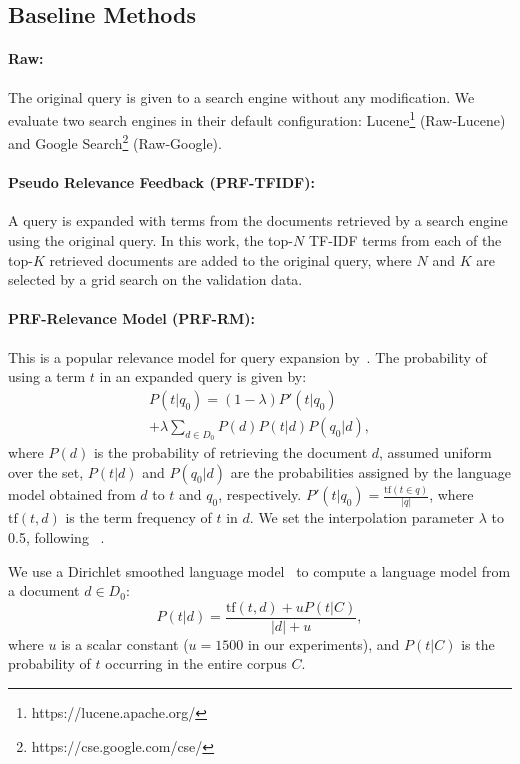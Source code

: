 \documentclass[11pt,letterpaper]{article}
\begin{document}
\subsection{Baseline Methods}

\paragraph{Raw:} The original query is given to a search engine without any modification. We evaluate two search engines in their default configuration: Lucene\footnote{https://lucene.apache.org/} (Raw-Lucene) and Google Search\footnote{https://cse.google.com/cse/} (Raw-Google). 

\paragraph{Pseudo Relevance Feedback (PRF-TFIDF):}
A query is expanded with terms from the documents retrieved by a search engine using the original query. In this work, the top-$N$ TF-IDF terms from each of the top-$K$ retrieved documents are added to the original query, where $N$ and $K$ are selected by a grid search on the validation data.

\paragraph{PRF-Relevance Model (PRF-RM):} This is a popular relevance model for query expansion by~\citet{lavrenko2001relevance}. The probability of using a term $t$ in an expanded query is given by:
\begin{multline}
P(t|q_0) = (1-\lambda) P'(t|q_0)\\
+ \lambda \sum_{d \in D_0} P(d) P(t|d) P(q_0|d),
\end{multline}
where $P(d)$ is the probability of retrieving the document $d$, assumed uniform over the set, $P(t|d)$ and $P(q_0|d)$ are the probabilities assigned by the language model obtained from $d$ to $t$ and $q_0$, respectively. $P'(t|q_0)= \frac{\text{tf}(t \in q)}{|q|}$, where $\text{tf}(t,d)$ is the term frequency of $t$ in $d$. We set the interpolation parameter $\lambda$ to 0.5, following ~\citet{zhai2001study}.

We use a Dirichlet smoothed language model~\cite{zhai2001study} to compute a language model from a document $d \in D_0$:
\begin{equation}
P(t|d)=\frac{\text{tf}(t,d)+u P(t|C)}{|d| + u},
\end{equation}
where $u$ is a scalar constant ($u=1500$ in our experiments), and $P(t|C)$ is the probability of $t$ occurring in the entire corpus $C$.
\end{document}
